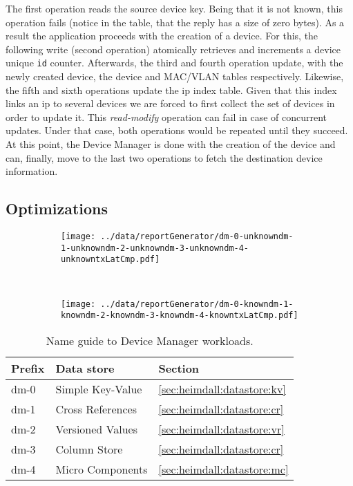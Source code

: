 The first operation reads the  source device key. Being
that it is not known, this operation fails (notice in the table, that
the reply has a size  of zero bytes). As a result the application
proceeds with the creation of a device. For this, the
following write (second operation) atomically retrieves
and increments a device unique \texttt{id} counter. Afterwards, the third and fourth  operation
update, with the newly created device, the device and MAC/VLAN
tables respectively. Likewise, the fifth and sixth operations update
the \gls{ip} index table. Given that this index links an \gls{ip} to
several devices we are forced to first collect the set of devices in
order to update it. This \emph{read-modify} operation can
fail in case of concurrent updates. Under that case, both operations
would be repeated until they succeed. At this point, the Device Manager
is done with the creation of the device and can, finally, move to the
last two operations to fetch the destination device information. 

\subsection{Optimizations}
\begin{figure}
  \centering
  \begin{subfigure}[b]{0.5\textwidth}
                \centering
                \texttt{[image: ../data/reportGenerator/dm-0-unknowndm-1-unknowndm-2-unknowndm-3-unknowndm-4-unknowntxLatCmp.pdf]}
                \caption{}
                \label{fig:}
        \end{subfigure}%
        ~
        \begin{subfigure}[b]{0.5\textwidth}
                \centering
                \texttt{[image: ../data/reportGenerator/dm-0-knowndm-1-knowndm-2-knowndm-3-knowndm-4-knowntxLatCmp.pdf]}
                \caption{}
                \label{}
        \end{subfigure}
        \caption[Device Manager performance analysis]{}
        \label{fig:dm:performance}
\end{figure}

\begin{table}
\small
\begin{tabular}{lll} 
    Prefix &  Data store & Section\\\toprule
    dm-0 & Simple Key-Value  & \ref{sec:heimdall:datastore:kv}  \\
    dm-1 & Cross References  & \ref{sec:heimdall:datastore:cr} \\
    dm-2 & Versioned Values & \ref{sec:heimdall:datastore:vr} \\
    dm-3 & Column Store & \ref{sec:heimdall:datastore:cr} \\
    dm-4 & Micro Components & \ref{sec:heimdall:datastore:mc} \\ 
  \end{tabular}
  \caption[Name guide to Device Manager workloads]{Name guide to
    Device Manager workloads.}
  \label{table:names:dm}
\end{table}

